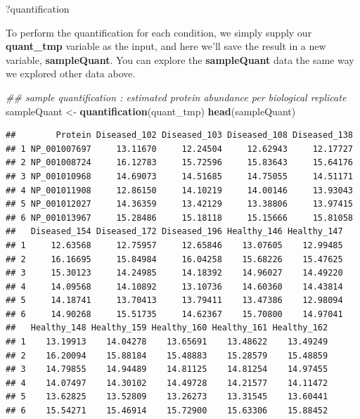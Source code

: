\documentclass[]{book}
\newenvironment{Shaded}{\begin{snugshade}}{\end{snugshade}}
\newcommand{\CommentTok}[1]{\textcolor[rgb]{0.56,0.35,0.01}{\textit{#1}}}
\newcommand{\KeywordTok}[1]{\textcolor[rgb]{0.13,0.29,0.53}{\textbf{#1}}}
\newcommand{\NormalTok}[1]{#1}
\newcommand{\StringTok}[1]{\textcolor[rgb]{0.31,0.60,0.02}{#1}}
\begin{document}
\begin{Shaded}
\begin{Highlighting}[]
\NormalTok{?quantification}
\end{Highlighting}
\end{Shaded}

To perform the quantification for each condition, we simply supply our \textbf{quant\_tmp} variable as the input, and here we'll save the result in a new variable, \textbf{sampleQuant}. You can explore the \textbf{sampleQuant} data the same way we explored other data above.

\begin{Shaded}
\begin{Highlighting}[]
\CommentTok{## sample quantification : estimated protein abundance per biological replicate}
\NormalTok{sampleQuant <-}\StringTok{ }\KeywordTok{quantification}\NormalTok{(quant_tmp)}
\KeywordTok{head}\NormalTok{(sampleQuant)}
\end{Highlighting}
\end{Shaded}

\begin{verbatim}
##        Protein Diseased_102 Diseased_103 Diseased_108 Diseased_138
## 1 NP_001007697     13.11670     12.24504     12.62943     12.17727
## 2 NP_001008724     16.12783     15.72596     15.83643     15.64176
## 3 NP_001010968     14.69073     14.51685     14.75055     14.51171
## 4 NP_001011908     12.86150     14.10219     14.00146     13.93043
## 5 NP_001012027     14.36359     13.42129     13.38806     13.97415
## 6 NP_001013967     15.28486     15.18118     15.15666     15.81058
##   Diseased_154 Diseased_172 Diseased_196 Healthy_146 Healthy_147
## 1     12.63568     12.75957     12.65846    13.07605    12.99485
## 2     16.16695     15.84984     16.04258    15.68226    15.47625
## 3     15.30123     14.24985     14.18392    14.96027    14.49220
## 4     14.09568     14.10892     13.10736    14.60360    14.43814
## 5     14.18741     13.70413     13.79411    13.47386    12.98094
## 6     14.90268     15.51735     14.62367    15.70800    14.97041
##   Healthy_148 Healthy_159 Healthy_160 Healthy_161 Healthy_162
## 1    13.19913    14.04278    13.65691    13.48622    13.49249
## 2    16.20094    15.88184    15.48883    15.28579    15.48859
## 3    14.79855    14.94489    14.81125    14.81254    14.97455
## 4    14.07497    14.30102    14.49728    14.21577    14.11472
## 5    13.62825    13.52809    13.26273    13.31545    13.60441
## 6    15.54271    15.46914    15.72900    15.63306    15.88452
\end{verbatim}
\end{document}
